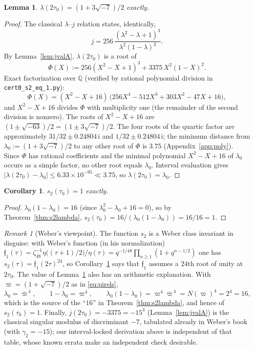 \documentclass[11pt]{article}
\newtheorem{lemma}[theorem]{Lemma}
\newtheorem{corollary}[theorem]{Corollary}
\theoremstyle{definition}
\theoremstyle{remark}
\newtheorem{remark}[theorem]{Remark}
\newcommand{\Qq}{\mathbb{Q}}
\newcommand{\ii}{\mathrm{i}}
\begin{document}
\begin{lemma}\label{lem:lamvalA}
$\lambda(2\tau_0)=(1+3\sqrt{-7})/2$ exactly.
\end{lemma}
\begin{proof}
The classical $\lambda$--$j$ relation states, identically,
\[
  j=256\,\frac{(\lambda^2-\lambda+1)^3}{\lambda^2(1-\lambda)^2}.
\]
By Lemma~\ref{lem:jvalA}, $\lambda(2\tau_0)$ is a root of
\[
  \Phi(X):=256(X^2-X+1)^3+3375\,X^2(1-X)^2.
\]
Exact factorization over $\Qq$ (verified by rational polynomial division in
\texttt{cert0\_s2\_eq\_1.py}):
\begin{equation}\label{eq:sextic}
  \Phi(X)=(X^2-X+16)\,\bigl(256X^4-512X^3+303X^2-47X+16\bigr),
\end{equation}
and $X^2-X+16$ divides $\Phi$ with multiplicity one (the remainder of the
second division is nonzero). The roots of $X^2-X+16$ are
$(1\pm\sqrt{-63})/2=(1\pm3\sqrt{-7})/2$. The four roots of the quartic
factor are approximately $31/32\pm0.24804\,\ii$ and $1/32\pm0.24804\,\ii$;
the minimum distance from $\lambda_0:=(1+3\sqrt{-7})/2$ to any other root
of $\Phi$ is $3.75$ (Appendix~\ref{app:poly}). Since $\Phi$ has rational
coefficients and the minimal polynomial $X^2-X+16$ of $\lambda_0$ occurs as
a simple factor, no other root equals $\lambda_0$. Interval evaluation gives
$|\lambda(2\tau_0)-\lambda_0|\le6.33\times10^{-95}\ll 3.75$, so
$\lambda(2\tau_0)=\lambda_0$.
\end{proof}

\begin{corollary}\label{cor:s2valA}
$s_2(\tau_0)=1$ exactly.
\end{corollary}
\begin{proof}
$\lambda_0(1-\lambda_0)=16$ (since $\lambda_0^2-\lambda_0+16=0$), so by
Theorem~\ref{thm:s2lambda},
$s_2(\tau_0)=16/(\lambda_0(1-\lambda_0))=16/16=1$.
\end{proof}

\begin{remark}[Weber's viewpoint]\label{rem:weber}
The function $s_2$ is a Weber class invariant in disguise: with Weber's
function (in his normalization)
$\mathfrak{f}_1(\tau)=\zeta_{48}^{-1}\eta\bigl((\tau+1)/2\bigr)/\eta(\tau)
=q^{-1/48}\prod_{n\ge1}(1+q^{n-1/2})$ one has
$s_2(\tau)=\mathfrak{f}_1(2\tau)^{24}$, so Corollary~\ref{cor:s2valA} says
that $\mathfrak{f}_1$ assumes a $24$th root of unity at $2\tau_0$. The
value of Lemma~\ref{lem:lamvalA} also has an arithmetic explanation. With
$\varpi=(1+\sqrt{-7})/2$ as in \eqref{eq:pirels},
\[
  \lambda_0=\bar\varpi^{\,4},\qquad 1-\lambda_0=\varpi^4,\qquad
  \lambda_0(1-\lambda_0)=\varpi^4\bar\varpi^{\,4}=N(\varpi)^4=2^4=16,
\]
which is the source of the ``$16$'' in Theorem~\ref{thm:s2lambda}, and
hence of $s_2(\tau_0)=1$. Finally, $j(2\tau_0)=-3375=-15^3$
(Lemma~\ref{lem:jvalA}) is the classical singular modulus of discriminant
$-7$, tabulated already in Weber's book \cite{We} (with $\gamma_2=-15$);
our interval-locked derivation above is independent of that table, whose
known errata \cite{BM} make an independent check desirable.
\end{remark}
\end{document}
